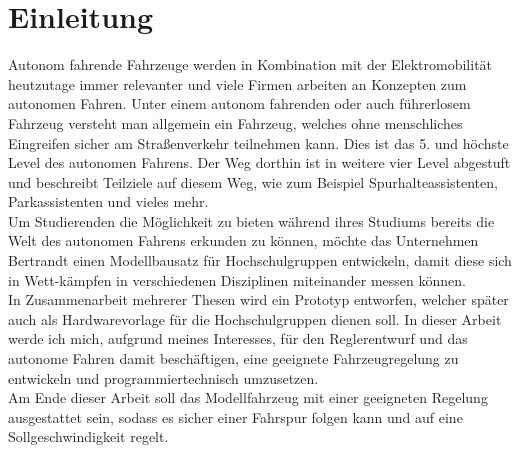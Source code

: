\chapter{Einleitung}

Autonom fahrende Fahrzeuge werden in Kombination mit der Elektromobilität heut\-zutage immer relevanter und viele Firmen arbeiten an Konzepten zum autonomen Fahren. Unter einem autonom fahrenden oder auch führerlosem Fahrzeug ver\-steht man allgemein ein Fahrzeug, welches ohne menschliches Eingreifen sicher am Straßenverkehr teilnehmen kann. Dies ist das 5. und höchste Level des autonomen Fahrens. Der Weg dorthin ist in weitere vier Level abgestuft und beschreibt Teilziele auf diesem Weg, wie zum Beispiel Spurhalteassistenten, Parkassistenten und vieles mehr.\\
Um Studierenden die Möglichkeit zu bieten während ihres Studiums bereits die Welt des autonomen Fahrens erkunden zu können, möchte das Unternehmen Bertrandt einen Modellbausatz für Hochschulgruppen entwickeln, damit diese sich in Wett-kämpfen in verschiedenen Disziplinen miteinander messen können.\\
In Zusammenarbeit mehrerer Thesen wird ein Prototyp entworfen, welcher später auch als Hardwarevorlage für die Hochschulgruppen dienen soll. In dieser Arbeit werde ich mich, aufgrund meines Interesses, für den Reglerentwurf und das autonome Fahren damit beschäftigen, eine geeignete Fahrzeugregelung zu entwickeln und programmiertechnisch umzusetzen. \\
Am Ende dieser Arbeit soll das Modellfahrzeug mit einer geeigneten Regelung ausgestattet sein, sodass es sicher einer Fahrspur folgen kann und auf eine Soll\-ge\-schwin\-dig\-keit regelt.\\

